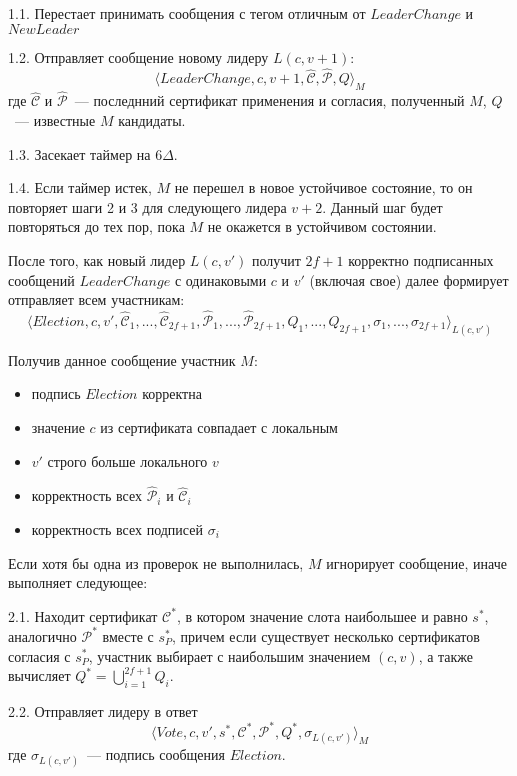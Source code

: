 1.1. Перестает принимать сообщения с тегом отличным от $LeaderChange$ и $NewLeader$

1.2. Отправляет сообщение новому лидеру $L(c, v+1)$:
\[ \langle LeaderChange, c, v+1,  \hat{\mathcal{C}}, \hat{\mathcal{P}}, Q \rangle_M \]
где $\hat{\mathcal{C}}$ и $\hat{\mathcal{P}}$~--- последнний сертификат применения и согласия, полученный $M$, $Q$~--- известные $M$ кандидаты.

1.3. Засекает таймер на $6\Delta$.

1.4. Если таймер истек, $M$ не перешел в новое устойчивое состояние, то он повторяет шаги 2 и 3 для следующего лидера $v+2$. Данный шаг будет повторяться до тех пор, пока $M$ не окажется в устойчивом состоянии.
\vspace{10pt}

После того, как новый лидер $L(c, v')$ получит $2f+1$ корректно подписанных сообщений $LeaderChange$ с одинаковыми $c$ и $v'$  (включая свое) далее формирует отправляет всем участникам:
\[ \langle Election, c, v', \hat{\mathcal{C}}_1,...,\hat{\mathcal{C}}_{2f+1}, \hat{\mathcal{P}}_1,...,\hat{\mathcal{P}}_{2f+1}, Q_1,..., Q_{2f+1}, \sigma_1,..., \sigma_{2f+1}\rangle_{L(c, v')} \]

Получив данное сообщение участник $M$:
\begin{itemize}
\item подпись $Election$ корректна
\item значение $c$ из сертификата совпадает с локальным
\item $v'$ строго больше локального $v$
\item корректность всех $\hat{\mathcal{P}}_i$ и $\hat{\mathcal{C}}_i$
\item корректность всех подписей $\sigma_i$
\end{itemize}
Если хотя бы одна из проверок не выполнилась, $M$ игнорирует сообщение, иначе выполняет следующее:

2.1. Находит сертификат $\mathcal{C}^{*}$, в котором значение слота наибольшее и равно $s^{*}$, аналогично $\mathcal{P}^{*}$ вместе с  $s_P^{*}$, причем если существует несколько сертификатов согласия с $s_P^{*}$, участник выбирает с наибольшим значением $(c, v)$, а также вычисляет $Q^{*}=\bigcup\limits_{i=1}^{2f+1} Q_i$.

2.2. Отправляет лидеру в ответ
\[ \langle Vote, c, v', s^{*}, \mathcal{C}^{*}, \mathcal{P}^{*}, Q^{*}, \sigma_{L(c, v')} \rangle_M \]
где $\sigma_{L(c, v')}$~--- подпись сообщения $Election$.
\vspace{10pt}

